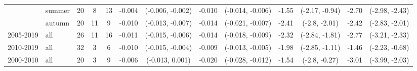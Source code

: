 \begin{table}[h]
\begin{center}
{\begin{tabular}{ll|ccc|cccc|cccc}
          & summer &              20 &           8 &          13 &                  -0.004 &  (-0.006, -0.002) & -0.010 &  (-0.014, -0.006) &                    -1.55 &  (-2.17, -0.94) & -2.70 &  (-2.98, -2.43) \\
          & autumn &              20 &          11 &           9 &                  -0.010 &  (-0.013, -0.007) & -0.014 &  (-0.021, -0.007) &                    -2.41 &   (-2.8, -2.01) & -2.42 &  (-2.83, -2.01) \\
2005-2019 & all &              26 &          11 &          16 &                  -0.011 &  (-0.015, -0.006) & -0.014 &  (-0.018, -0.009) &                    -2.32 &  (-2.84, -1.81) & -2.77 &  (-3.21, -2.33) \\
2010-2019 & all &              32 &           3 &           6 &                  -0.010 &  (-0.015, -0.004) & -0.009 &  (-0.013, -0.005) &                    -1.98 &  (-2.85, -1.11) & -1.46 &  (-2.23, -0.68) \\
2000-2010 & all &              20 &           3 &           9 &                  -0.006 &   (-0.013, 0.001) & -0.020 &  (-0.028, -0.012) &                    -1.54 &   (-2.8, -0.27) & -3.01 &  (-3.99, -2.03) \\
\bottomrule
\end{tabular}}
\end{center}
\end{table}

